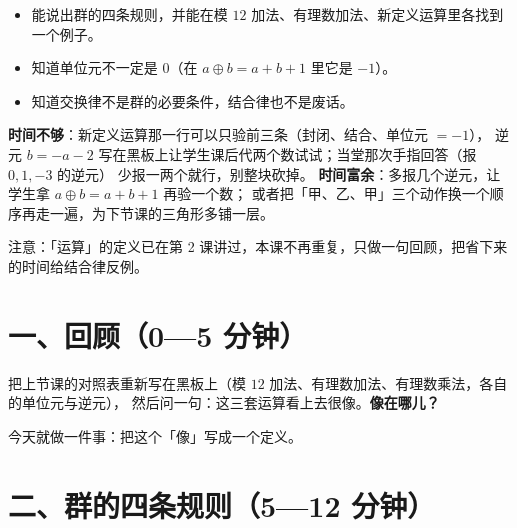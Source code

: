 

\begin{mubiao}
  \begin{itemize}
    \item 能说出群的四条规则，并能在模 \(12\) 加法、有理数加法、新定义运算里各找到一个例子。
    \item 知道单位元不一定是 \(0\)（在 \(a\oplus b=a+b+1\) 里它是 \(-1\)）。
    \item 知道交换律不是群的必要条件，结合律也不是废话。
  \end{itemize}
\end{mubiao}


\begin{beifen}
  \textbf{时间不够}：新定义运算那一行可以只验前三条（封闭、结合、单位元 \(=-1\)），
  逆元 \(b=-a-2\) 写在黑板上让学生课后代两个数试试；当堂那次手指回答（报 \(0,1,-3\) 的逆元）
  少报一两个就行，别整块砍掉。
  \textbf{时间富余}：多报几个逆元，让学生拿 \(a\oplus b=a+b+1\) 再验一个数；
  或者把「甲、乙、甲」三个动作换一个顺序再走一遍，为下节课的三角形多铺一层。
\end{beifen}

注意：「运算」的定义已在第 2 课讲过，本课不再重复，只做一句回顾，把省下来的时间给结合律反例。

\section*{一、回顾（0—5 分钟）}

把上节课的对照表重新写在黑板上（模 \(12\) 加法、有理数加法、有理数乘法，各自的单位元与逆元），
然后问一句：这三套运算看上去很像。\textbf{像在哪儿？}

今天就做一件事：把这个「像」写成一个定义。

\section*{二、群的四条规则（5—12 分钟）}

